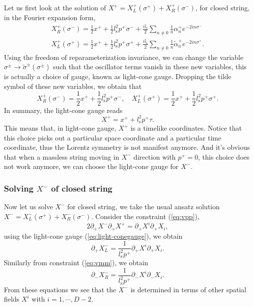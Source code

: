 \documentclass[graybox,envcountchap,sectrefs]{svmono}
\begin{document}
Let us first look at the solution of $X^{+}=X_{L}^{+}(\sigma^+)+X_{R}^{+}(\sigma^-)$, for closed string, in the Fourier expansion form, 
\begin{align}
X_{R}^{+}(\sigma^-)=\frac{1}{2}x^{+}+\frac{1}{2} l_{\mathrm{s}}^2 p^{+} \sigma^{-}+\frac{il_{\mathrm{s}}}{2}\sum_{n\neq 0}\frac{1}{n}\alpha^{+}_ne^{-2in\sigma^-}\\
X_{L}^{+}(\sigma^+)=\frac{1}{2}x^{+}+\frac{1}{2} l_{\mathrm{s}}^2 p^{+} \sigma^{+}+\frac{il_{\mathrm{s}}}{2}\sum_{n\neq 0}\frac{1}{n}\tilde{\alpha}^{+}_ne^{-2in\sigma^+}.
\end{align}
Using the freedom of reparameterization invariance, we can change the variable $\sigma^{\pm}\to \tilde{\sigma}^{\pm}(\sigma^{\pm})$ such that the oscillator terms vanish in these new variables, this is actually a choice of gauge, known as light-cone gauge. Dropping the tilde symbol of these new variables, we obtain that
\begin{equation}
X_{R}^{+}(\sigma^-)=\frac{1}{2}x^{+}+\frac{1}{2} l_{\mathrm{s}}^2 p^{+} \sigma^{-},\quad X_{L}^{+}(\sigma^+)=\frac{1}{2}x^{+}+\frac{1}{2} l_{\mathrm{s}}^2 p^{+} \sigma^{+}.
\end{equation}
In summary, the light-cone gauge reads
\begin{equation}
\boxed{X^{+}=x^{+}+l_{\mathrm{s}}^2p^{+}\tau.} \label{eq:light-conegauge}
\end{equation}
This means that, in light-cone gauge, $X^{+}$ is a timelike coordinates.  
Notice that this choice picks out a particular space coordinate and a particular time coordinate, thus the Lorentz symmetry is not manifest anymore.
And it's obvious that when a massless string moving in $X^-$ direction with $p^+=0$, this choice does not work anymore, we can choose the light-cone gauge for $X^-$.


\subsubsection*{Solving $X^-$ of closed string}
Now let us solve $X^-$ for closed string, we take the usual ansatz solution $X^{-}=X_{L}^{-}(\sigma^+)+X_R^{-}(\sigma^-)$. Consider the constraint (\ref{eq:vpp}),
\begin{equation}
2 \partial_{+} X^{-} \partial_{+} X^{+}=\partial_{+} X^{i} \partial_{+} X_{i},
\end{equation} 
using the light-cone gauge (\ref{eq:light-conegauge}), we obtain
\begin{equation}
\partial_+ X^-_{L}= \frac{1}{l_{\mathrm{s}}^2p^+}\partial_{+} X^{i} \partial_{+} X_{i}. \label{eq:Ld}
\end{equation}
Similarly from constraint (\ref{eq:vmm}), we obtain
\begin{equation}
\partial_{-} X^-_{R}= \frac{1}{l_{\mathrm{s}}^2p^+}\partial_{-} X^{i} \partial_{-} X_{i}. \label{eq:Rd}
\end{equation}
From these equations we see that the $X^-$ is determined in terms of other spatial fields $X^i$ with $i=1,\cdots,D-2$.
\end{document}
